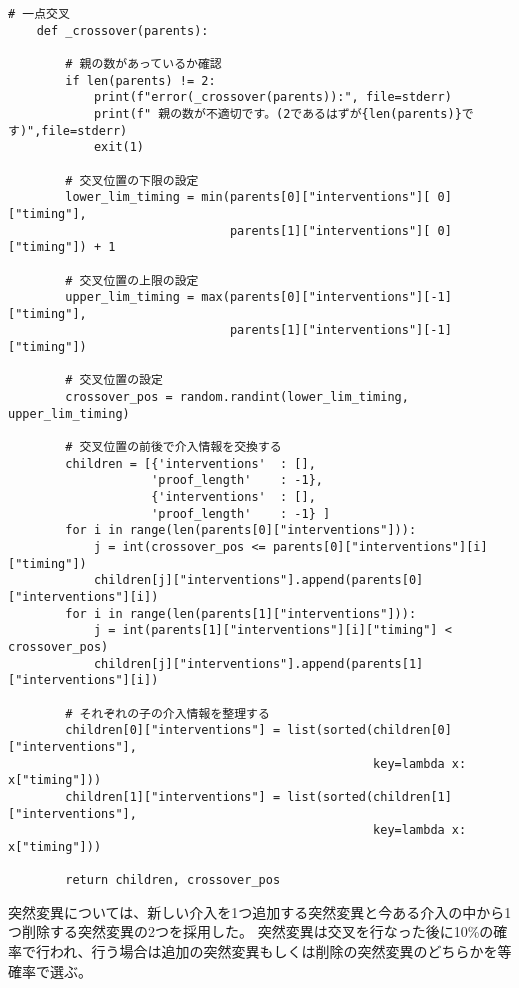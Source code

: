 \begin{lstlisting}[caption=1点交叉を行う関数\_crossover]
    # 一点交叉
    def _crossover(parents):

        # 親の数があっているか確認
        if len(parents) != 2:
            print(f"error(_crossover(parents)):", file=stderr)
            print(f" 親の数が不適切です。(2であるはずが{len(parents)}です)",file=stderr)
            exit(1)

        # 交叉位置の下限の設定
        lower_lim_timing = min(parents[0]["interventions"][ 0]["timing"],
                               parents[1]["interventions"][ 0]["timing"]) + 1
        
        # 交叉位置の上限の設定
        upper_lim_timing = max(parents[0]["interventions"][-1]["timing"],
                               parents[1]["interventions"][-1]["timing"])

        # 交叉位置の設定
        crossover_pos = random.randint(lower_lim_timing, upper_lim_timing)

        # 交叉位置の前後で介入情報を交換する
        children = [{'interventions'  : [],
                    'proof_length'    : -1},
                    {'interventions'  : [],
                    'proof_length'    : -1} ]
        for i in range(len(parents[0]["interventions"])):
            j = int(crossover_pos <= parents[0]["interventions"][i]["timing"])
            children[j]["interventions"].append(parents[0]["interventions"][i])
        for i in range(len(parents[1]["interventions"])):
            j = int(parents[1]["interventions"][i]["timing"] < crossover_pos)
            children[j]["interventions"].append(parents[1]["interventions"][i])

        # それぞれの子の介入情報を整理する
        children[0]["interventions"] = list(sorted(children[0]["interventions"],
                                                   key=lambda x: x["timing"]))
        children[1]["interventions"] = list(sorted(children[1]["interventions"],
                                                   key=lambda x: x["timing"]))

        return children, crossover_pos
\end{lstlisting}

突然変異については、新しい介入を1つ追加する突然変異と今ある介入の中から1つ削除する突然変異の2つを採用した。
突然変異は交叉を行なった後に10\%の確率で行われ、行う場合は追加の突然変異もしくは削除の突然変異のどちらかを等確率で選ぶ。

